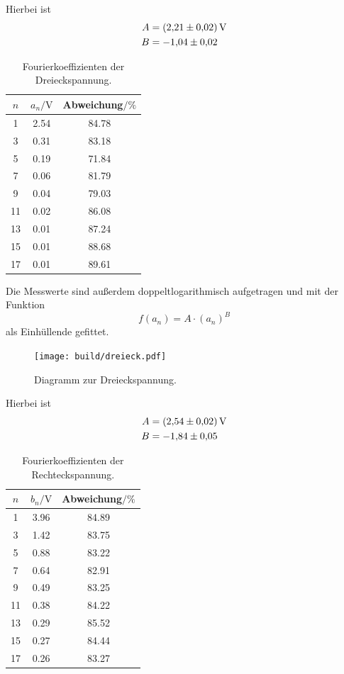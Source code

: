 Hierbei ist
\begin{align}
    A &= \SI{2.21\pm0.02}{\volt}\\
    B &= \num{-1.04\pm0.02}
\end{align}
%
\begin{table}[H]
    \caption{Fourierkoeffizienten der Dreieckspannung.}
    \label{tab:dreieck}
    \centering
    \begin{tabular}{S[table-format=2.0(0)e0] S[table-format=1.2(0)e0] S[table-format=2.2]}
        \toprule
        {$n$} & {$a_n/\si{\volt}$} & {Abweichung$/\si{\percent}$}\\
          & 2.54 & 84.78 \\
        3  & 0.31 & 83.18 \\
        5  & 0.19 & 71.84 \\
        7  & 0.06 & 81.79 \\
        9  & 0.04 & 79.03 \\
        11 & 0.02 & 86.08 \\
        13 & 0.01 & 87.24 \\
        15 & 0.01 & 88.68 \\
        17 & 0.01 & 89.61 \\
        \bottomrule
    \end{tabular}
\end{table}
\noindent
Die Messwerte sind außerdem doppeltlogarithmisch aufgetragen und mit der Funktion
\begin{equation}
    f(a_n) = A\cdot(a_n)^B
\end{equation}
als Einhüllende gefittet.
\begin{figure}[H]
    \centering
    \caption{Diagramm zur Dreieckspannung.}
    \texttt{[image: build/dreieck.pdf]}
\end{figure}
Hierbei ist
\begin{align}
    A &= \SI{2.54\pm0.02}{\volt}\\
    B &= \num{-1.84\pm0.05}
\end{align}
%
\begin{table}[H]
    \caption{Fourierkoeffizienten der Rechteckspannung.}
    \label{tab:rechteck}
    \centering
    \begin{tabular}{S[table-format=2.0(0)e0] S[table-format=1.2(0)e0] S[table-format=2.2]}
        \toprule
        {$n$} & {$b_n/\si{\volt}$} & {Abweichung$/\si{\percent}$}\\
          & 3.96 & 84.89 \\
        3  & 1.42 & 83.75 \\
        5  & 0.88 & 83.22 \\
        7  & 0.64 & 82.91 \\
        9  & 0.49 & 83.25 \\
        11 & 0.38 & 84.22 \\
        13 & 0.29 & 85.52 \\
        15 & 0.27 & 84.44 \\
        17 & 0.26 & 83.27 \\
        \bottomrule
    \end{tabular}
\end{table}
